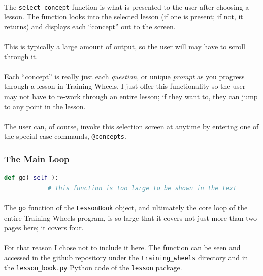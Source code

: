 \documentclass[11pt]{article}
\begin{document}
	\paragraph{} The \texttt{select\_concept} function is what is presented to the user after choosing a lesson. The function looks into the selected lesson (if one is present; if not, it returns) and displays each ``concept'' out to the screen.

	\paragraph{} This is typically a large amount of output, so the user will may have to scroll through it.

	\paragraph{} Each ``concept'' is really just each \textit{question}, or unique \textit{prompt} as you progress through a lesson in Training Wheels. I just offer this functionality so the user may not have to re-work through an entire lesson; if they want to, they can jump to any point in the lesson.

	\paragraph{} The user can, of course, invoke this selection screen at anytime by entering one of the special case commands, \texttt{@concepts}.

	\newpage

	\subsubsection{The Main Loop}

	\begin{lstlisting}[language=Python]
		def go( self ):
			# This function is too large to be shown in the text
	\end{lstlisting}


	\paragraph{} The \texttt{go} function of the \texttt{LessonBook} object, and ultimately the core loop of the entire Training Wheels program, is so large that it covers not just more than two pages here; it covers four.

	\paragraph{} For that reason I chose not to include it here. The function can be seen and accessed in the github repository under the \texttt{training\_wheels} directory and in the \texttt{lesson\_book.py} Python code of the \texttt{lesson} package.
\end{document}
